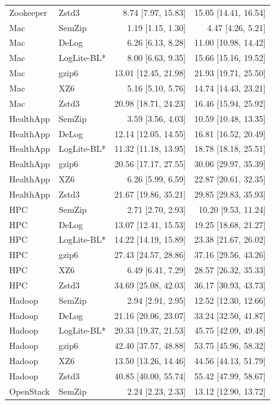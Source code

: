 \begin{longtable}{llrr}
Zookeeper & Zstd3 & 8.74 [7.97, 15.83] & 15.05 [14.41, 16.54] \\
Mac & SemZip & 1.19 [1.15, 1.30] & 4.47 [4.26, 5.21] \\
Mac & DeLog & 6.26 [6.13, 8.28] & 11.00 [10.98, 14.42] \\
Mac & LogLite-BL* & 8.00 [6.63, 9.35] & 15.66 [15.16, 19.52] \\
Mac & gzip6 & 13.01 [12.45, 21.98] & 21.93 [19.71, 25.50] \\
Mac & XZ6 & 5.16 [5.10, 5.76] & 14.74 [14.43, 23.21] \\
Mac & Zstd3 & 20.98 [18.71, 24.23] & 16.46 [15.94, 25.92] \\
HealthApp & SemZip & 3.59 [3.56, 4.03] & 10.59 [10.48, 13.35] \\
HealthApp & DeLog & 12.14 [12.05, 14.55] & 16.81 [16.52, 20.49] \\
HealthApp & LogLite-BL* & 11.32 [11.18, 13.95] & 18.78 [18.18, 25.51] \\
HealthApp & gzip6 & 20.56 [17.17, 27.55] & 30.06 [29.97, 35.39] \\
HealthApp & XZ6 & 6.26 [5.99, 6.59] & 22.87 [20.61, 32.35] \\
HealthApp & Zstd3 & 21.67 [19.86, 35.21] & 29.85 [29.83, 35.93] \\
HPC & SemZip & 2.71 [2.70, 2.93] & 10.20 [9.53, 11.24] \\
HPC & DeLog & 13.07 [12.41, 15.53] & 19.25 [18.68, 21.27] \\
HPC & LogLite-BL* & 14.22 [14.19, 15.89] & 23.38 [21.67, 26.02] \\
HPC & gzip6 & 27.43 [24.57, 28.86] & 37.16 [29.56, 43.26] \\
HPC & XZ6 & 6.49 [6.41, 7.29] & 28.57 [26.32, 35.33] \\
HPC & Zstd3 & 34.69 [25.08, 42.03] & 36.17 [30.93, 43.73] \\
Hadoop & SemZip & 2.94 [2.91, 2.95] & 12.52 [12.30, 12.66] \\
Hadoop & DeLog & 21.16 [20.06, 23.07] & 33.24 [32.50, 41.87] \\
Hadoop & LogLite-BL* & 20.33 [19.37, 21.53] & 45.75 [42.09, 49.48] \\
Hadoop & gzip6 & 42.40 [37.57, 48.88] & 53.75 [45.96, 58.32] \\
Hadoop & XZ6 & 13.50 [13.26, 14.46] & 44.56 [44.13, 51.79] \\
Hadoop & Zstd3 & 40.85 [40.00, 55.74] & 55.42 [47.99, 58.67] \\
OpenStack & SemZip & 2.24 [2.23, 2.33] & 13.12 [12.90, 13.72] \\

\end{longtable}
